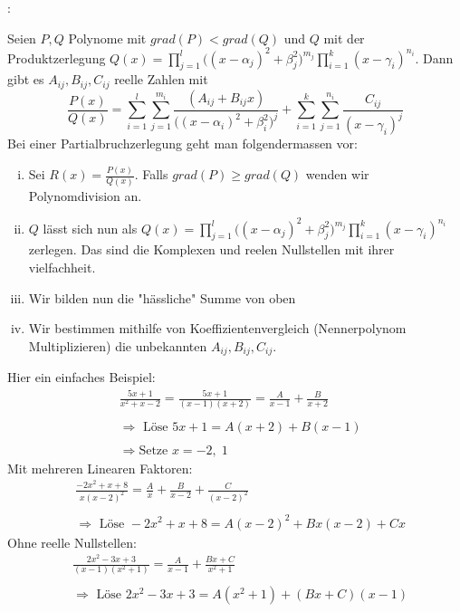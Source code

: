 \documentclass[7pt,landscape, margin = 0.1mm]{article}
\newcommand{\KRZ}[2]{\vspace{1mm} \hline \vspace{1mm} \color{chaptercolor}{RC #1}:\color{black} \   \hspace{0.2cm}\vspace{1mm}   {\begin{minipage}{20em}
#2 \end{minipage}} \vspace{1mm}  \hline \vspace{1mm}  \\}
\begin{document}
\begin{multicols}{4}
\begin{flushleft}
\KRZ{Partialbruchzerlegung}{Seien $P, Q$ Polynome mit $grad(P) < grad(Q)$ und $Q$ mit der Produktzerlegung $Q(x) = \prod_{j = 1}^l \big( (x- \alpha_j)^2 + \beta_j^2\big)^{m_j} \prod_{i = 1}^k (x - \gamma_i)^{n_i}$. Dann gibt es $A_{ij}, B_{ij}, C_{ij}$ reelle Zahlen mit
$$
  \frac{P(x)}{Q(x)} = \sum_{i = 1}^l \sum_{j = 1}^{m_i} \frac{(A_{ij} + B_{ij}x)}{\big( (x- \alpha_i)^2 + \beta_i^2\big)^j} + \sum_{i = 1}^k \sum_{j = 1}^{n_i} \frac{C_{ij}}{(x-\gamma_i)^j}
$$
Bei einer Partialbruchzerlegung geht man folgendermassen vor:
\begin{enumerate}[(i)]
  \item Sei $R(x) = \frac{P(x)}{Q(x)}$. Falls $grad(P) \geq grad(Q)$ wenden wir Polynomdivision an.
  \item $Q$ lässt sich nun als $Q(x) = \prod_{j = 1}^l \big( (x- \alpha_j)^2 + \beta_j^2\big)^{m_j} \prod_{i = 1}^k (x - \gamma_i)^{n_i}$ zerlegen. Das sind
  die Komplexen und reelen Nullstellen mit ihrer vielfachheit.
  \item Wir bilden nun die "hässliche" Summe von oben
  \item Wir bestimmen mithilfe von Koeffizientenvergleich (Nennerpolynom Multiplizieren) die unbekannten $A_{ij}, B_{ij}, C_{ij}$.
\end{enumerate}
Hier ein einfaches Beispiel:
\begin{align*}
  &\frac{5x + 1}{x^2 + x - 2} = \frac{5x + 1}{(x - 1)(x + 2)} = \frac{A}{x - 1} + \frac{B}{x + 2}\\ \\
  &\Rightarrow \text{ Löse } 5x + 1 = A(x + 2) + B(x - 1)\\ \\
  &\Rightarrow \text{Setze } x = -2,\;1
\end{align*}
Mit mehreren Linearen Faktoren:
\begin{align*}
  &\frac{-2x^2 + x + 8}{x (x-2)^2} = \frac{A}{x} + \frac{B}{x - 2} + \frac{C}{(x-2)^2}\\ \\
  &\Rightarrow \text{ Löse } -2x^2 + x + 8 = A(x - 2)^2 + Bx(x - 2) + Cx
\end{align*}
Ohne reelle Nullstellen:
\begin{align*}
  &\frac{2x^2 -3x + 3}{(x-1)(x^2 + 1)} = \frac{A}{x - 1} + \frac{Bx + C}{x^2 + 1}\\ \\
  &\Rightarrow \text{ Löse } 2x^2 -3x + 3 = A(x^2 + 1) + (Bx + C)(x - 1)\\ \\

\end{align*}}
\end{flushleft}
\end{multicols}
\end{document}
